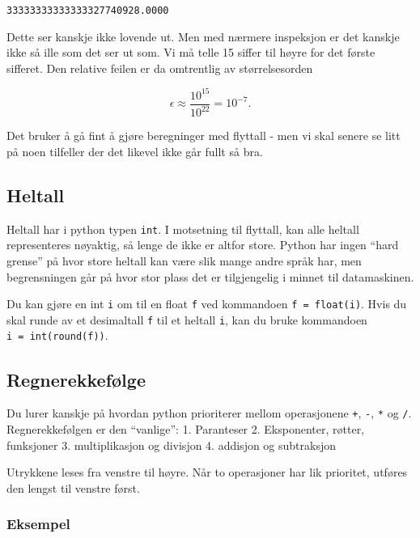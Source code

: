 \documentclass[11pt]{article}
\begin{document}
    \begin{Verbatim}[commandchars=\\\{\}]
33333333333333327740928.0000
    \end{Verbatim}

    Dette ser kanskje ikke lovende ut. Men med nærmere inspeksjon er det
kanskje ikke så ille som det ser ut som. Vi må telle 15 siffer til høyre
for det første sifferet. Den relative feilen er da omtrentlig av
størrelsesorden

\[\epsilon \approx \frac{10^{15}}{10^{22}} = 10^{-7}.\]

Det bruker å gå fint å gjøre beregninger med flyttall - men vi skal
senere se litt på noen tilfeller der det likevel ikke går fullt så bra.

    \hypertarget{heltall}{%
\subsection{Heltall}\label{heltall}}

Heltall har i python typen \texttt{int}. I motsetning til flyttall, kan
alle heltall representeres nøyaktig, så lenge de ikke er altfor store.
Python har ingen ``hard grense'' på hvor store heltall kan være slik
mange andre språk har, men begrensningen går på hvor stor plass det er
tilgjengelig i minnet til datamaskinen.

Du kan gjøre en int \texttt{i} om til en float \texttt{f} ved kommandoen
\texttt{f\ =\ float(i)}. Hvis du skal runde av et desimaltall \texttt{f}
til et heltall \texttt{i}, kan du bruke kommandoen
\texttt{i\ =\ int(round(f))}.

    \hypertarget{regnerekkefuxf8lge}{%
\subsection{Regnerekkefølge}\label{regnerekkefuxf8lge}}

Du lurer kanskje på hvordan python prioriterer mellom operasjonene
\texttt{+}, \texttt{-}, \texttt{*} og \texttt{/}. Regnerekkefølgen er
den ``vanlige'': 1. Paranteser 2. Eksponenter, røtter, funksjoner 3.
multiplikasjon og divisjon 4. addisjon og subtraksjon

Utrykkene leses fra venstre til høyre. Når to operasjoner har lik
prioritet, utføres den lengst til venstre først.

    \hypertarget{eksempel}{%
\subsubsection{Eksempel}\label{eksempel}}
\end{document}
